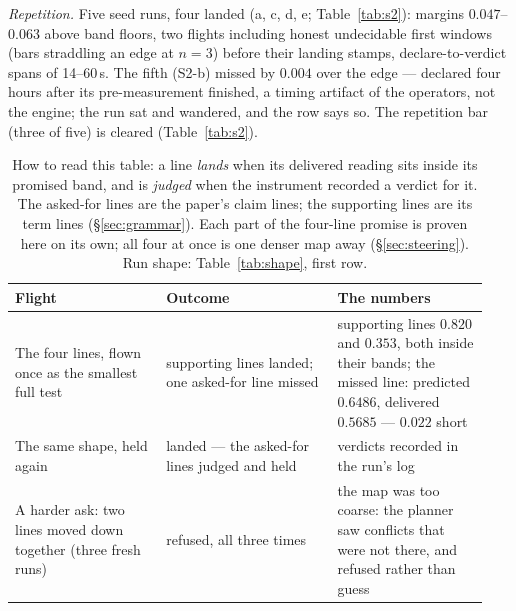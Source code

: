 \documentclass[11pt,a4paper]{article}
\begin{document}
\emph{Repetition.} Five seed runs, four landed (a, c, d, e;
Table~\ref{tab:s2}): margins $0.047$--$0.063$ above band floors,
two flights including honest undecidable first windows (bars
straddling an edge at $n{=}3$) before their landing stamps,
declare-to-verdict spans of 14--60\,s. The fifth (S2-b) missed by
$0.004$ over the edge --- declared four hours after its
pre-measurement finished, a timing artifact of the operators, not
the engine; the run sat and wandered, and the row says so. The
repetition bar (three of five) is cleared (Table~\ref{tab:s2}).

\begin{table}[!ht]
\centering
\small
\begin{tabular}{@{}p{0.30\linewidth}p{0.34\linewidth}p{0.30\linewidth}@{}}
\toprule
\textbf{Flight} & \textbf{Outcome} & \textbf{The numbers} \\
\midrule
The four lines, flown once as the smallest full test &
supporting lines landed; one asked-for line missed &
supporting lines $0.820$ and $0.353$, both inside their bands;
the missed line: predicted $0.6486$, delivered $0.5685$ ---
$0.022$ short \\
The same shape, held again & landed --- the asked-for lines judged
and held & verdicts recorded in the run's log \\
A harder ask: two lines moved down together (three fresh runs) &
refused, all three times &
the map was too coarse: the planner saw conflicts that were not
there, and refused rather than guess \\
\bottomrule
\end{tabular}
\caption{How to read this table: a line \emph{lands} when its
delivered reading sits inside its promised band, and is
\emph{judged} when the instrument recorded a verdict for it. The
asked-for lines are the paper's claim lines; the supporting lines
are its term lines (\S\ref{sec:grammar}). Each part of the
four-line promise is proven here on its own; all four at once is
one denser map away (\S\ref{sec:steering}). Run shape:
Table~\ref{tab:shape}, first row.}
\label{tab:s1}
\end{table}
\end{document}
